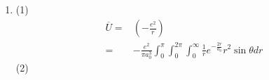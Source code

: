 
\subsection{ }
\begin{enumerate}
\item 
(1)
\begin{equation}
\begin{aligned}
\overline{U}=&(-\frac{e^2}{r})\\
=&-\frac{e^2}{\pi a^{3}_{0}}\int^{\pi}_{0}\int^{2\pi}_{0}\int^{\infty}_{0} \frac{1}{r}e^{-\frac{2r}{a_0}}r^{2}\sin{\theta}dr
\end{aligned}
\end{equation}
(2)
\end{enumerate}